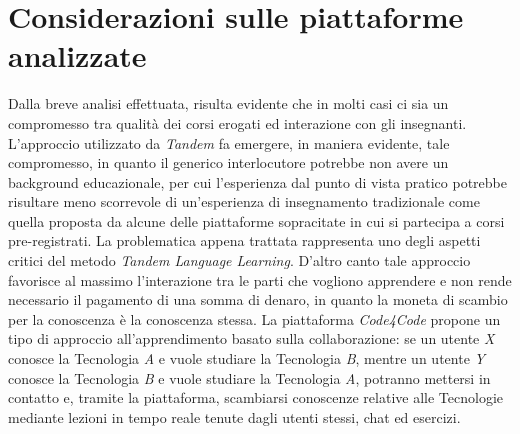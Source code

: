\section{Considerazioni sulle piattaforme analizzate}
Dalla breve analisi effettuata, risulta evidente che in molti casi ci sia un compromesso tra qualità dei corsi erogati ed interazione con gli insegnanti. L'approccio utilizzato da \emph{Tandem} fa emergere, in maniera evidente, tale compromesso, in quanto il generico interlocutore potrebbe non avere un background educazionale, per cui l'esperienza dal punto di vista pratico potrebbe risultare meno scorrevole di un'esperienza di insegnamento tradizionale come quella proposta da alcune delle piattaforme sopracitate in cui si partecipa a corsi pre-registrati. La problematica appena trattata rappresenta uno degli aspetti critici del metodo \emph{Tandem Language Learning}. D'altro canto tale approccio favorisce al massimo l'interazione tra le parti che vogliono apprendere e non rende necessario il pagamento di una somma di denaro, in quanto la moneta di scambio per la conoscenza è la conoscenza stessa. La piattaforma \emph{Code4Code} propone un tipo di approccio all'apprendimento basato sulla collaborazione: se un utente \emph{X} conosce la Tecnologia \emph{A} e vuole studiare la Tecnologia \emph{B}, mentre un utente \emph{Y} conosce la Tecnologia \emph{B} e vuole studiare la Tecnologia \emph{A}, potranno mettersi in contatto e, tramite la piattaforma, scambiarsi conoscenze relative alle Tecnologie mediante lezioni in tempo reale tenute dagli utenti stessi, chat ed esercizi. 